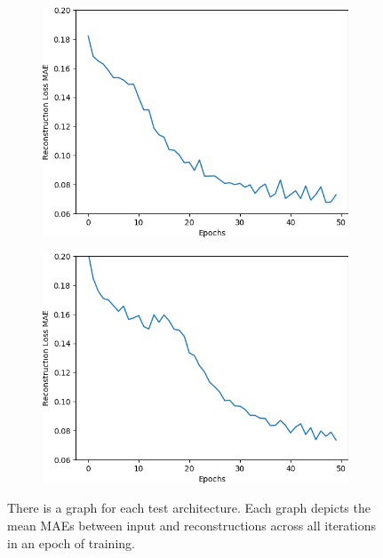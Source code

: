 \begin{figure}[H]
\begin{subfigure}{.25\textwidth}
        \centering
        \includegraphics[width=\textwidth]
        {images/figures/experiments_architecture/mae_graphKernel3adjusted16x16x64_dim1024.png}
        \caption{}
    \end{subfigure}%
    \begin{subfigure}{.25\textwidth}
        \centering
        \includegraphics[width=\textwidth]
        {images/figures/experiments_architecture/mae_graphKernel3adjusted32x32x32_dim1024.png}
        \caption{}
    \end{subfigure}
    \caption{There is a graph for each test architecture.
    Each graph depicts the mean MAEs between input and reconstructions 
    across all iterations in an epoch of training.} \label{figure_learning_curves2}
\end{figure} 

